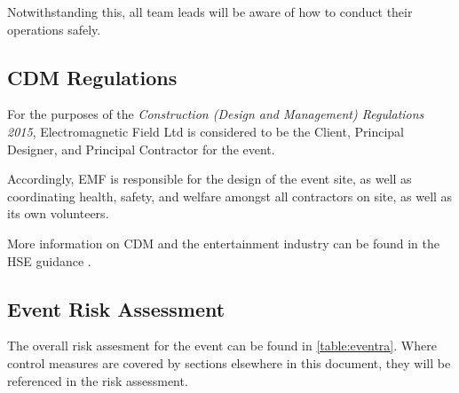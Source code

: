 Notwithstanding this, all team leads will be aware of how to conduct their
operations safely.

\subsection{CDM Regulations}

For the purposes of the \textit{Construction (Design and Management) Regulations 2015},
Electromagnetic Field Ltd is considered to be the Client, Principal Designer,
and Principal Contractor for the event.

Accordingly, EMF is responsible for the design of the event site, as well as
coordinating health, safety, and welfare amongst all contractors on site, as well
as its own volunteers.

More information on CDM and the entertainment industry can be found in the HSE
guidance \cite{cdmguidance}.

\subsection{Event Risk Assessment}
The overall risk assesment for the event can be found in \cref{table:eventra}.
Where control measures are covered by sections elsewhere in this document, they
will be referenced in the risk assessment.


